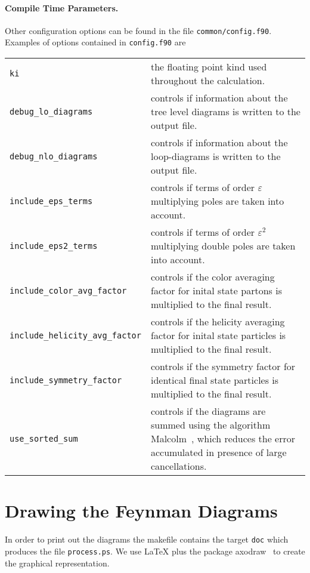 \documentclass[11pt,a4paper]{refrep}
\begin{document}
\paragraph{Compile Time Parameters.}
Other configuration options can be found in the file \texttt{common/config.f90}.
\smallskip
Examples of options contained in \texttt{config.f90} are
\begin{maxipage}
\begin{tabular}{lp{}}
\texttt{ki} & the floating point kind used throughout the calculation.\\
\texttt{debug\_lo\_diagrams} & controls if information about the
    tree level diagrams is written to the output file.\\
\texttt{debug\_nlo\_diagrams} & controls if information about the
    loop-diagrams is written to the output file.\\
\texttt{include\_eps\_terms} & controls if
    terms of order $\varepsilon$ multiplying
    poles are taken into account.\\
\texttt{include\_eps2\_terms} & controls if
    terms of order $\varepsilon^2$ multiplying
    double poles are taken into account.\\
\texttt{include\_color\_avg\_factor} & controls if the color averaging
    factor for inital state partons is multiplied to the final result.\\
\texttt{include\_helicity\_avg\_factor} & controls if the helicity averaging
    factor for inital state particles is multiplied to the final result.\\
\texttt{include\_symmetry\_factor} & controls if the symmetry
    factor for identical final state particles
    is multiplied to the final result. \\
\texttt{use\_sorted\_sum} & controls if the diagrams are summed using
    the algorithm Malcolm~\cite{Malcolm:1970}, which reduces the error
    accumulated in presence of large cancellations.
\end{tabular}
\end{maxipage}

\section{Drawing the Feynman Diagrams}
In order to print out the diagrams the makefile contains the target
\texttt{doc} which produces the file \texttt{process.ps}.
We use \LaTeX{} plus the package \textsf{axodraw}~\cite{Vermaseren:1994je}
to create the graphical representation.
\end{document}
